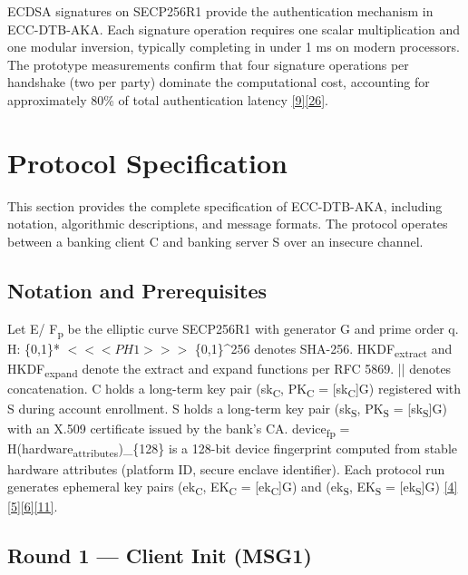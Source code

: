 \indent ECDSA signatures on SECP256R1 provide the authentication mechanism in ECC-DTB-AKA. Each signature operation requires one scalar multiplication and one modular inversion, typically completing in under 1 ms on modern processors. The prototype measurements confirm that four signature operations per handshake (two per party) dominate the computational cost, accounting for approximately 80\% of total authentication latency \hyperref[ref:9]{[9]}\hyperref[ref:26]{[26]}.

\section{Protocol Specification}

\indent This section provides the complete specification of ECC-DTB-AKA, including notation, algorithmic descriptions, and message formats. The protocol operates between a banking client C and banking server S over an insecure channel.

\subsection{Notation and Prerequisites}

\indent Let E/ F\textsubscript{p} be the elliptic curve SECP256R1 with generator G and prime order q. H: \{0,1\}* $<<<PH1>>>$ \{0,1\}\textasciicircum{}256 denotes SHA-256. HKDF\textsubscript{extract} and HKDF\textsubscript{expand} denote the extract and expand functions per RFC 5869. || denotes concatenation. C holds a long-term key pair (sk\textsubscript{C}, PK\textsubscript{C} = [sk\textsubscript{C}]G) registered with S during account enrollment. S holds a long-term key pair (sk\textsubscript{S}, PK\textsubscript{S} = [sk\textsubscript{S}]G) with an X.509 certificate issued by the bank's CA. device\textsubscript{fp} = H(hardware\textsubscript{attributes})\_\{128\} is a 128-bit device fingerprint computed from stable hardware attributes (platform ID, secure enclave identifier). Each protocol run generates ephemeral key pairs (ek\textsubscript{C}, EK\textsubscript{C} = [ek\textsubscript{C}]G) and (ek\textsubscript{S}, EK\textsubscript{S} = [ek\textsubscript{S}]G) \hyperref[ref:4]{[4]}\hyperref[ref:5]{[5]}\hyperref[ref:6]{[6]}\hyperref[ref:11]{[11]}.

\subsection{Round 1 --- Client Init (MSG1)}

